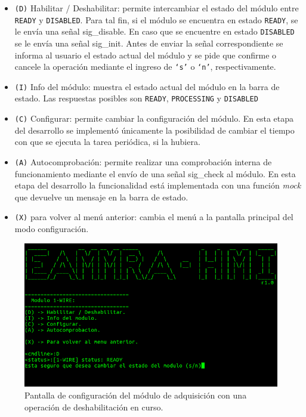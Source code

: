 \begin{itemize}
  \item \texttt{(D)} Habilitar / Deshabilitar: permite intercambiar el estado del módulo entre \texttt{READY} y \texttt{DISABLED}.  Para tal fin, si el módulo se encuentra en estado \texttt{READY}, se le envía una señal sig\_disable.  En caso que se encuentre en estado \texttt{DISABLED} se le envía una señal sig\_init.  Antes de enviar la señal correspondiente se informa al usuario el estado actual del módulo y se pide que confirme o cancele la operación mediante el ingreso de \texttt{`s'} o \texttt{`n'}, respectivamente.
  \item \texttt{(I)} Info del módulo: muestra el estado actual del módulo en la barra de estado.  Las respuestas posibles son \texttt{READY}, \texttt{PROCESSING} y \texttt{DISABLED}
  \item \texttt{(C)} Configurar: permite cambiar la configuración del módulo.  En esta etapa del desarrollo se implementó únicamente la posibilidad de cambiar el tiempo con que se ejecuta la tarea periódica, si la hubiera.
  \item \texttt{(A)} Autocomprobación: permite realizar una comprobación interna de funcionamiento mediante el envío de una señal sig\_check al módulo. En esta etapa del desarrollo la funcionalidad está implementada con una función \textit{mock} que devuelve un mensaje en la barra de estado.
  \item \texttt{(X)} para volver al menú anterior: cambia el menú a la pantalla principal del modo configuración.
\end{itemize}

\begin{figure}[htpb]
	\centering
	\includegraphics[width=\textwidth]{./Figures/interfaz_config_detalle.png}
	\caption[Pantalla de configuración del módulo de adquisición.]{Pantalla de configuración del módulo de adquisición con una operación de deshabilitación en curso.}
	\label{fig:interfaz_config_detalle}
\end{figure}

